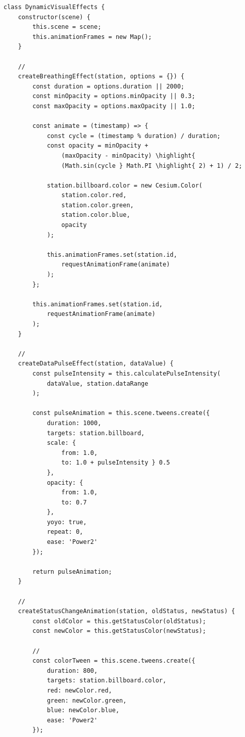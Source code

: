 \begin{lstlisting}[style=javascript]
class DynamicVisualEffects {
    constructor(scene) {
        this.scene = scene;
        this.animationFrames = new Map();
    }
    
    // 
    createBreathingEffect(station, options = {}) {
        const duration = options.duration || 2000;
        const minOpacity = options.minOpacity || 0.3;
        const maxOpacity = options.maxOpacity || 1.0;
        
        const animate = (timestamp) => {
            const cycle = (timestamp % duration) / duration;
            const opacity = minOpacity + 
                (maxOpacity - minOpacity) \highlight{ 
                (Math.sin(cycle } Math.PI \highlight{ 2) + 1) / 2;
            
            station.billboard.color = new Cesium.Color(
                station.color.red,
                station.color.green,
                station.color.blue,
                opacity
            );
            
            this.animationFrames.set(station.id, 
                requestAnimationFrame(animate)
            );
        };
        
        this.animationFrames.set(station.id,
            requestAnimationFrame(animate)
        );
    }
    
    // 
    createDataPulseEffect(station, dataValue) {
        const pulseIntensity = this.calculatePulseIntensity(
            dataValue, station.dataRange
        );
        
        const pulseAnimation = this.scene.tweens.create({
            duration: 1000,
            targets: station.billboard,
            scale: {
                from: 1.0,
                to: 1.0 + pulseIntensity } 0.5
            },
            opacity: {
                from: 1.0,
                to: 0.7
            },
            yoyo: true,
            repeat: 0,
            ease: 'Power2'
        });
        
        return pulseAnimation;
    }
    
    // 
    createStatusChangeAnimation(station, oldStatus, newStatus) {
        const oldColor = this.getStatusColor(oldStatus);
        const newColor = this.getStatusColor(newStatus);
        
        // 
        const colorTween = this.scene.tweens.create({
            duration: 800,
            targets: station.billboard.color,
            red: newColor.red,
            green: newColor.green,
            blue: newColor.blue,
            ease: 'Power2'
        });
        

\end{lstlisting}
